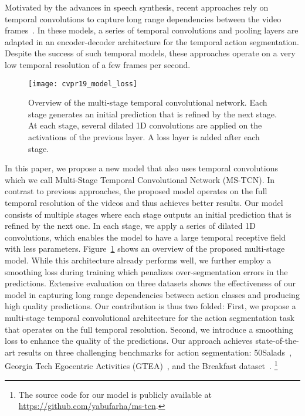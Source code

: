 \documentclass[10pt,twocolumn,letterpaper]{article}
\begin{document}
Motivated by the advances in speech synthesis, recent approaches rely on 
temporal convolutions to capture long range dependencies between the video 
frames~\cite{Lea_2017_CVPR, lei2018temporal, ding2018weakly}. In these models, 
a series of temporal convolutions and pooling layers are adapted in an 
encoder-decoder architecture for the temporal action segmentation. Despite 
the success of such temporal models, these approaches operate on a very low 
temporal resolution of a few frames per second.

\begin{figure}[tb]
\begin{center}
   \texttt{[image: cvpr19\_model\_loss]}
\end{center}
   \caption{Overview of the multi-stage temporal convolutional network. 
   Each stage generates an initial prediction that is refined by the next stage. 
   At each stage, several dilated 1D convolutions are applied on the activations 
   of the previous layer. A loss layer is added after each stage.}
\label{fig:model}
\end{figure}

In this paper, we propose a new model that also uses temporal convolutions 
which we call Multi-Stage Temporal Convolutional Network (MS-TCN). 
In contrast to previous approaches, the proposed model operates 
on the full temporal resolution of the videos and thus achieves better 
results. Our model consists of multiple stages where each stage outputs 
an initial prediction that is refined by the next one. In each stage, we 
apply a series of dilated 1D convolutions, which enables the model to 
have a large temporal receptive field with less parameters. Figure~\ref{fig:model} 
shows an overview of the proposed multi-stage model. While this architecture 
already performs well, we further employ a smoothing loss during training 
which penalizes over-segmentation errors in the predictions. Extensive 
evaluation on three datasets shows the effectiveness of our model in capturing 
long range dependencies between action classes and producing high quality 
predictions. Our contribution is thus two folded: First, we propose a multi-stage 
temporal convolutional architecture for the action segmentation task that operates on 
the full temporal resolution. Second, we introduce a smoothing loss to enhance the 
quality of the predictions. Our approach achieves state-of-the-art results on three 
challenging benchmarks for action segmentation: 50Salads~\cite{stein2013combining}, 
Georgia Tech Egocentric Activities (GTEA)~\cite{fathi2011learning}, and the Breakfast 
dataset~\cite{kuehne2014language}. \footnote{The source code for our model is publicly 
available at \url{https://github.com/yabufarha/ms-tcn}.}
\end{document}
